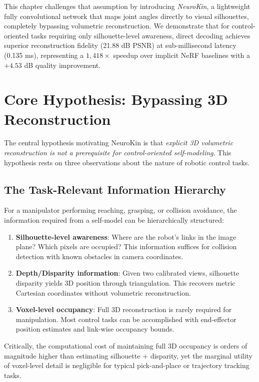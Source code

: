 \documentclass[12pt,a4paper,oneside]{report}
\begin{document}
This chapter challenges that assumption by introducing \textit{NeuroKin}, a lightweight fully convolutional network that maps joint angles directly to visual silhouettes, completely bypassing volumetric reconstruction. We demonstrate that for control-oriented tasks requiring only silhouette-level awareness, direct decoding achieves superior reconstruction fidelity (21.88 dB PSNR) at sub-millisecond latency (0.135 ms), representing a $1,418\times$ speedup over implicit NeRF baselines with a $+4.53$ dB quality improvement.

\section{Core Hypothesis: Bypassing 3D Reconstruction}

The central hypothesis motivating NeuroKin is that \textit{explicit 3D volumetric reconstruction is not a prerequisite for control-oriented self-modeling}. This hypothesis rests on three observations about the nature of robotic control tasks.

\subsection{The Task-Relevant Information Hierarchy}

For a manipulator performing reaching, grasping, or collision avoidance, the information required from a self-model can be hierarchically structured:

\begin{enumerate}
    \item \textbf{Silhouette-level awareness}: Where are the robot's links in the image plane? Which pixels are occupied? This information suffices for collision detection with known obstacles in camera coordinates.
    \item \textbf{Depth/Disparity information}: Given two calibrated views, silhouette disparity yields 3D position through triangulation. This recovers metric Cartesian coordinates without volumetric reconstruction.
    \item \textbf{Voxel-level occupancy}: Full 3D reconstruction is rarely required for manipulation. Most control tasks can be accomplished with end-effector position estimates and link-wise occupancy bounds.
\end{enumerate}

Critically, the computational cost of maintaining full 3D occupancy is orders of magnitude higher than estimating silhouette + disparity, yet the marginal utility of voxel-level detail is negligible for typical pick-and-place or trajectory tracking tasks.
\end{document}
